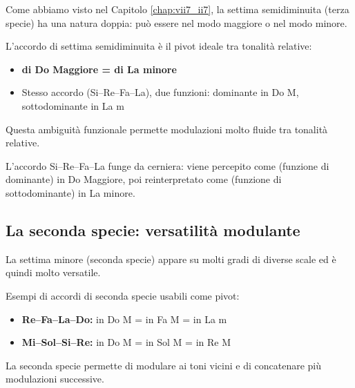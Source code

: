 Come abbiamo visto nel Capitolo \ref{chap:vii7_ii7}, la settima semidiminuita (terza specie) ha una natura doppia: può essere  nel modo maggiore o  nel modo minore.

\begin{regola}
	\label{reg:seconda_specie_pivot}
	L'accordo di settima semidiminuita è il pivot ideale tra tonalità relative:
	
	\begin{itemize}
		\item \textbf{ di Do Maggiore =  di La minore}
		\item Stesso accordo (Si--Re--Fa--La), due funzioni: dominante in Do M, sottodominante in La m
	\end{itemize}
	
	Questa ambiguità funzionale permette modulazioni molto fluide tra tonalità relative.
\end{regola}

\begin{esempio}[Modulazione con \sigla{VIIø}{7}{} = \sigla{IIø}{7}{} come pivot]
	\label{ex:mod_seconda_specie}

	L'accordo Si--Re--Fa--La funge da cerniera: viene percepito come  (funzione di dominante) in Do Maggiore, poi reinterpretato come  (funzione di sottodominante) in La minore.
\end{esempio}

\subsection{La seconda specie: versatilità modulante}
\label{subsec:terza_specie_pivot}

La settima minore (seconda specie) appare su molti gradi di diverse scale ed è quindi molto versatile.

\begin{regola}
	\label{reg:terza_specie_pivot}
	Esempi di accordi di seconda specie usabili come pivot:
	
	\begin{itemize}
		\item \textbf{Re--Fa--La--Do:}  in Do M =  in Fa M =  in La m
		\item \textbf{Mi--Sol--Si--Re:}  in Do M =  in Sol M =  in Re M
	\end{itemize}
	
	La seconda specie permette di modulare ai toni vicini e di concatenare più modulazioni successive.
\end{regola}

